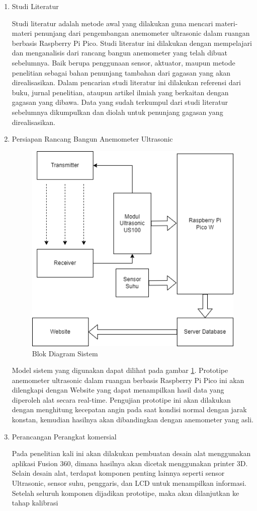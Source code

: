 \begin{enumerate}
  \item Studi Literatur
  
  Studi literatur adalah metode awal yang dilakukan guna mencari materi-materi penunjang dari pengembangan anemometer ultrasonic 
  dalam ruangan berbasis Raspberry Pi Pico. Studi literatur ini dilakukan dengan mempelajari dan menganalisis dari rancang bangun 
  anemometer yang telah dibuat sebelumnya. Baik berupa penggunaan sensor, aktuator, maupun metode penelitian sebagai bahan penunjang 
  tambahan dari gagasan yang akan direalisasikan. Dalam pencarian studi literatur ini dilakukan referensi dari buku, jurnal penelitian, 
  ataupun artikel ilmiah yang berkaitan dengan gagasan yang dibawa. Data yang sudah terkumpul dari studi literatur sebelumnya dikumpulkan
  dan diolah untuk penunjang gagasan yang direalisasikan.

  \item Persiapan Rancang Bangun Anemometer Ultrasonic

  \begin{figure}[h!]
    \centering
    \includegraphics[width=0.4\linewidth]{"gambar/Blok diagram anemometer ultrasonic"}
    \caption{Blok Diagram Sistem}
    \label{fig:blok-diagram-anemometer-ultrasonic}
  \end{figure}

  Model sistem yang digunakan dapat dilihat pada  gambar \ref{fig:blok-diagram-anemometer-ultrasonic}. Prototipe anemometer ultrasonic dalam ruangan berbasis 
  Raspberry Pi Pico ini akan dilengkapi dengan Website yang dapat menampilkan hasil data yang diperoleh alat secara real-time. Pengujian prototipe ini akan dilakukan 
  dengan menghitung kecepatan angin pada saat kondisi normal dengan jarak konstan, kemudian hasilnya akan dibandingkan dengan anemometer yang asli. 

  \item Perancangan Perangkat komersial
  
  Pada penelitian kali ini akan dilakukan pembuatan desain alat menggunakan aplikasi Fusion 360, dimana hasilnya akan dicetak menggunakan printer 3D. Selain desain alat, terdapat komponen
  penting lainnya seperti sensor Ultrasonic, sensor suhu, penggaris, dan LCD untuk menampilkan informasi. Setelah seluruh komponen dijadikan prototipe, maka akan dilanjutkan ke tahap kalibrasi


\end{enumerate}
